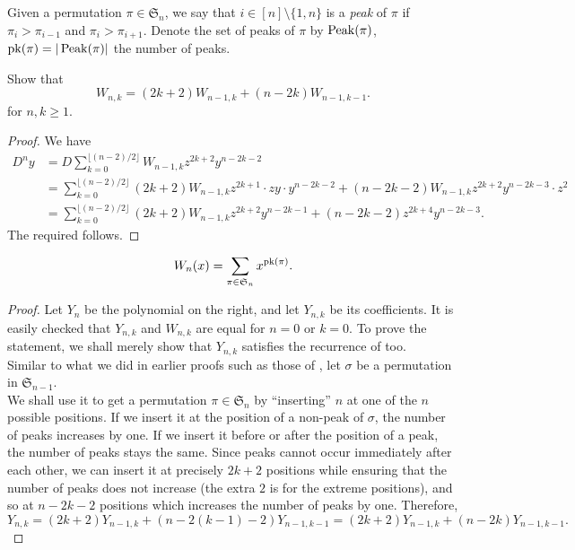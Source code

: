 	\begin{fdef}[Peak]
		Given a permutation $\pi \in \mathfrak{S}_n$, we say that $i \in [n] \setminus \{1,n\}$ is a \emph{peak} of $\pi$ if $\pi_i > \pi_{i-1}$ and $\pi_i > \pi_{i+1}$. Denote the set of peaks of $\pi$ by $\operatorname{Peak}(\pi)$, $\operatorname{pk}(\pi) = |\operatorname{Peak}(\pi)|$ the number of peaks.
	\end{fdef}

	\begin{lemma}
		\label{lem: Wnk recurrence}
		Show that
		\[ W_{n,k} = (2k+2) W_{n-1,k} + (n-2k) W_{n-1,k-1}. \]
		for $n,k \ge 1$.
	\end{lemma}
	\begin{proof}
		We have
		\begin{align*}
			D^{n}y &= D \sum_{k=0}^{\lfloor (n-2)/2 \rfloor} W_{n-1,k} z^{2k+2} y^{n-2k-2} \\
				&= \sum_{k=0}^{\lfloor (n-2)/2 \rfloor} (2k+2) W_{n-1,k} z^{2k+1} \cdot zy \cdot y^{n-2k-2} + (n-2k-2) W_{n-1,k} z^{2k+2} y^{n-2k-3} \cdot z^2 \\
				&= \sum_{k=0}^{\lfloor (n-2)/2 \rfloor} (2k+2) W_{n-1,k} z^{2k+2} y^{n-2k-1} + (n-2k-2) z^{2k+4} y^{n-2k-3}.
		\end{align*}
		The required follows.
	\end{proof}

	\begin{ftheo}
		\[ W_n(x) = \sum_{\pi \in \mathfrak{S}_n} x^{\operatorname{pk}(\pi)}. \]
	\end{ftheo}
	\begin{proof}
		Let $Y_n$ be the polynomial on the right, and let $Y_{n,k}$ be its coefficients. It is easily checked that $Y_{n,k}$ and $W_{n,k}$ are equal for $n=0$ or $k=0$. To prove the statement, we shall merely show that $Y_{n,k}$ satisfies the recurrence of  too.\\
		Similar to what we did in earlier proofs such as those of , let $\sigma$ be a permutation in $\mathfrak{S}_{n-1}$.\\ We shall use it to get a permutation $\pi \in \mathfrak{S}_n$ by ``inserting'' $n$ at one of the $n$ possible positions. If we insert it at the position of a non-peak of $\sigma$, the number of peaks increases by one. If we insert it before or after the position of a peak, the number of peaks stays the same. Since peaks cannot occur immediately after each other, we can insert it at precisely $2k+2$ positions while ensuring that the number of peaks does not increase (the extra $2$ is for the extreme positions), and so at $n-2k-2$ positions which increases the number of peaks by one. Therefore,
		\[ Y_{n,k} = (2k+2)Y_{n-1,k} + (n-2(k-1)-2)Y_{n-1,k-1} = (2k+2) Y_{n-1,k} + (n-2k)Y_{n-1,k-1}. \]
	\end{proof}

